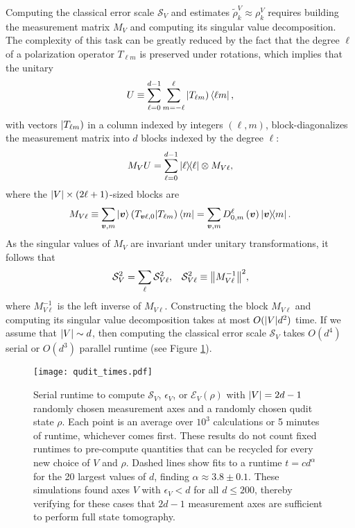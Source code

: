 \documentclass[a4paper,twocolumn,unpublished]{quantumarticle}
\newcommand{\p}[1]{\left(#1\right)} %
\newcommand{\E}{\mathcal{E}}
\renewcommand{\S}{\mathcal{S}}
\def\oket#1{\mathinner{|{#1})}}
\def\obk#1{\mathinner{({#1})}}
\begin{document}
Computing the classical error scale $\S_V$ and estimates $\tilde\rho^V_k\approx\rho^V_k$ requires building the measurement matrix $M_V$ and computing its singular value decomposition.
The complexity of this task can be greatly reduced by the fact that the degree $\ell$ of a polarization operator $T_{\ell m}$ is preserved under rotations, which implies that the unitary
\begin{align}
  U \equiv \sum_{\ell=0}^{d-1} \sum_{m=-\ell}^\ell
  \oket{T_{\ell m}} \bra{\ell m},
  \label{eq:trans_basis}
\end{align}
with vectors $\oket{T_{\ell m}}$ in a column indexed by integers $\p{\ell,m}$, block-diagonalizes the measurement matrix into $d$ blocks indexed by the degree $\ell$:
\begin{align}
  M_V U = \sum_{\ell=0}^{d-1} \op{\ell} \otimes M_{V\ell},
\end{align}
where the $\abs{V}\times\p{2\ell+1}$-sized blocks are
\begin{align}
  M_{V\ell} \equiv \sum_{\bm v,m} \ket{\bm v}
  \obk{T_{\bm v\ell,0}|T_{\ell m}} \bra{m}
  = \sum_{\bm v,m} D^\ell_{0,m}\p{\bm v} \op{\bm v}{m}.
  \label{eq:block}
\end{align}
As the singular values of $M_V$ are invariant under unitary transformations, it follows that
\begin{align}
  \S_V^2 = \sum_\ell \S_{V\ell}^2,
  &&
  \S_{V\ell}^2 \equiv \norm{M_{V\ell}^{-1}}^2,
\end{align}
where $M_{V\ell}^{-1}$ is the left inverse of $M_{V\ell}$.
Constructing the block $M_{V\ell}$ and computing its singular value decomposition takes at most $O(\abs{V}d^2)$ time.
If we assume that $\abs{V}\sim d$, then computing the classical error scale $\S_V$ takes $O(d^4)$ serial or $O(d^3)$ parallel runtime (see Figure \ref{fig:times}).

\begin{figure}
  \centering
  \texttt{[image: qudit\_times.pdf]}
  \caption{Serial runtime to compute $\S_V$, $\epsilon_V$, or $\E_V\p{\rho}$ with $\abs{V}=2d-1$ randomly chosen measurement axes and a randomly chosen qudit state $\rho$.
    Each point is an average over $10^3$ calculations or 5 minutes of runtime, whichever comes first.
    These results do not count fixed runtimes to pre-compute quantities that can be recycled for every new choice of $V$ and $\rho$.
    Dashed lines show fits to a runtime $t=c d^\alpha$ for the 20 largest values of $d$, finding $\alpha\approx 3.8\pm0.1$.
    These simulations found axes $V$ with $\epsilon_V<d$ for all $d\le200$, thereby verifying for these cases that $2d-1$ measurement axes are sufficient to perform full state tomography.}
  \label{fig:times}
\end{figure}
\end{document}

